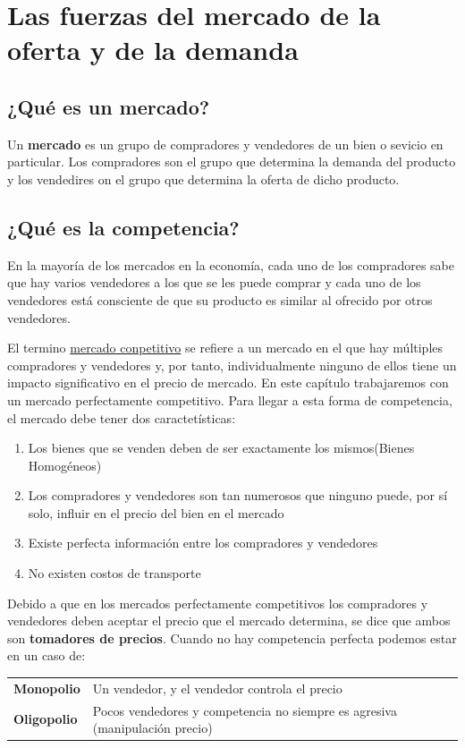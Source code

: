 \newpage

\section{Las fuerzas del mercado de la oferta y de la demanda}

\subsection{¿Qué es un mercado?}
Un {\bf mercado} es un grupo de compradores y vendedores de un bien o sevicio en particular. Los
compradores son el grupo que determina la demanda del producto y los vendedires on el grupo que determina la oferta de dicho producto.
\subsection{¿Qué es la competencia?}
En la mayoría de los mercados en la economía, cada uno de los compradores sabe que hay varios vendedores a los que se les puede comprar y cada uno de los vendedores está consciente de que su producto es similar al ofrecido por otros vendedores. 
\par El termino \underline{mercado conpetitivo} se refiere a un mercado en el que hay múltiples compradores y vendedores y, por tanto, individualmente ninguno de ellos tiene un impacto significativo en el precio de mercado. En este capítulo trabajaremos con un mercado perfectamente competitivo. 
Para llegar a esta forma de competencia, el mercado debe tener dos caractetísticas:
\begin{enumerate}
\item{Los bienes que se venden deben de ser exactamente los mismos(Bienes Homogéneos)}
\item{Los compradores y vendedores son tan numerosos que ninguno puede, por sí solo, influir en el precio del bien en el mercado}
\item{Existe perfecta información entre los compradores y vendedores}
\item{No existen costos de transporte}
\end{enumerate}
Debido a que en los mercados perfectamente competitivos los compradores y vendedores deben aceptar el precio que el mercado determina, se dice que ambos son {\bf tomadores de precios}. Cuando no hay competencia perfecta podemos estar en un caso de:

\begingroup
\setlength{\tabcolsep}{5pt} %
\renewcommand{\arraystretch}{1.5} %
\begin{center}
\begin{tabular}{p{1.7cm}|p{11cm}}
{\bf Monopolio}& Un vendedor, y el vendedor controla el precio\\
{\bf Oligopolio}& Pocos vendedores y competencia no siempre es agresiva (manipulación precio)
\end{tabular}
\end{center}
\endgroup

